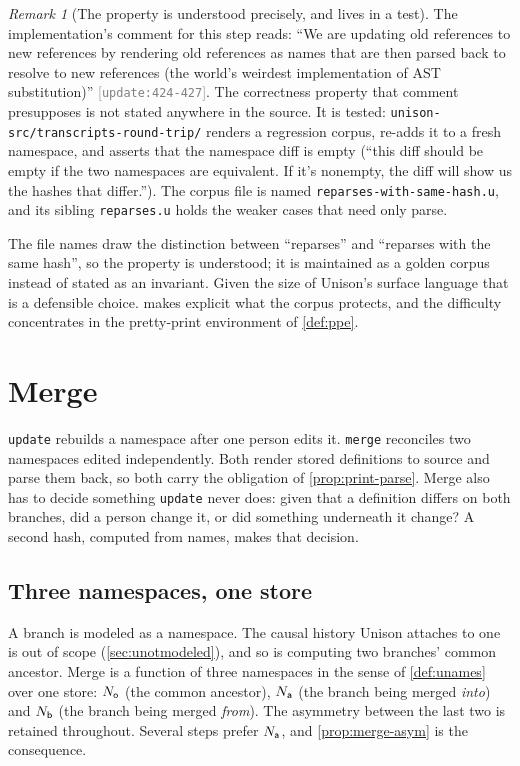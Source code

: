 \documentclass[11pt]{article}
\theoremstyle{definition}
\theoremstyle{plain}
\theoremstyle{remark}
\newtheorem{remark}{Remark}[section]
\newcommand{\src}[1]{{\footnotesize\textcolor{gray}{[\texttt{#1}]}}}
\begin{document}
\begin{remark}[The property is understood precisely, and lives in a test]\label{rem:printparse}
The implementation's comment for this step reads: ``We are updating old references to new references
by rendering old references as names that are then parsed back to resolve to new references (the
world's weirdest implementation of AST substitution)'' \src{update:424-427}. The correctness property
that comment presupposes is not stated anywhere in the source. It is tested:
\texttt{unison-src/transcripts-round-trip/} renders a regression corpus, re-adds it to a fresh
namespace, and asserts that the namespace diff is empty (``this diff should be empty if the two
namespaces are equivalent. If it's nonempty, the diff will show us the hashes that differ.''). The
corpus file is named \texttt{reparses-with-same-hash.u}, and its sibling \texttt{reparses.u} holds the
weaker cases that need only parse.

The file names draw the distinction between ``reparses'' and ``reparses with the same hash'', so the
property is understood; it is maintained as a golden corpus instead of stated as an invariant. Given
the size of Unison's surface language that is a defensible choice.  makes
explicit what the corpus protects, and the difficulty concentrates in the pretty-print environment of
\cref{def:ppe}.
\end{remark}

\section{Merge}\label{sec:umerge}

\texttt{update} rebuilds a namespace after one person edits it. \texttt{merge} reconciles two
namespaces edited independently. Both render stored definitions to source and parse them back, so
both carry the obligation of \cref{prop:print-parse}. Merge also has to decide something
\texttt{update} never does: given that a definition differs on both branches, did a person change it,
or did something underneath it change? A second hash, computed from names, makes that decision.

\subsection{Three namespaces, one store}

A branch is modeled as a namespace. The causal history Unison attaches to one is out of scope
(\cref{sec:unotmodeled}), and so is computing two branches' common ancestor. Merge is a function of
three namespaces in the sense of \cref{def:unames} over one store: $N_{\mathsf{o}}$ (the common ancestor), $N_{\mathsf{a}}$
(the branch being merged \emph{into}) and $N_{\mathsf{b}}$ (the branch being merged \emph{from}). The asymmetry
between the last two is retained throughout. Several steps prefer $N_{\mathsf{a}}$, and \cref{prop:merge-asym} is
the consequence.
\end{document}

